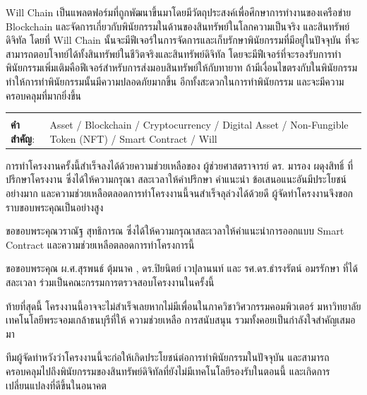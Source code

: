 \documentclass[12pt,oneside,openright,a4paper]{cpe-thai-project}
\begin{document}
Will Chain เป็นแพลตฟอร์มที่ถูกพัฒนาขึ้นมาโดยมีวัตถุประสงค์เพื่อศึกษาการทำงานของเครือข่าย Blockchain  และจัดการเกี่ยวกับพินัยกรรมในด้านของสินทรัพย์ในโลกความเป็นจริง และสินทรัพย์ดิจิทัล โดยที่ Will Chain นั้นจะมีฟีเจอร์ในการจัดการและเก็บรักษาพินัยกรรมที่มีอยู่ในปัจจุบัน ที่จะสามารถตอบโจทย์ได้ทั้งสินทรัพย์ในชีวิตจริงและสินทรัพย์ดิจิทัล โดยจะมีฟีเจอร์ที่จะรองรับการทำพินัยกรรมเพิ่มเติมคือฟีเจอร์สำหรับการส่งมอบสินทรัพย์ให้กับทายาท ถ้ามีเงื่อนไขตรงกับในพินัยกรรม ทำให้การทำพินัยกรรมนั้นมีความปลอดภัยมากขึ้น อีกทั้งสะดวกในการทำพินัยกรรม และจะมีความครอบคลุมที่มากยิ่งขึ้น
\begin{flushleft}
\begin{tabular*}{\textwidth}{@{}lp{}}
 & \\

\textbf{คำสำคัญ}: & Asset / Blockchain / Cryptocurrency / Digital Asset / Non-Fungible Token (NFT) /  Smart Contract / Will 
\end{tabular*}
\end{flushleft}
\endabstract


\preface
\tab การทําโครงงานครั้งนี้สําเร็จลงได้ด้วยความช่วยเหลือของ ผู้ช่วยศาสตราจารย์ ดร. มารอง ผดุงสิทธิ์ ที่ปรึกษาโครงงาน ซึ่งได้ให้ความกรุณา สละเวลาให้คําปรึกษา คําแนะนํา ข้อเสนอแนะอันมีประโยชน์อย่างมาก และความช่วยเหลือตลอดการทําโครงงานนี้จนสําเร็จลุล่วงได้ด้วยดี ผู้จัดทําโครงงานจึงขอกราบขอบพระคุณเป็นอย่างสูง

\tab ขอขอบพระคุณวราณัฐ สุทธิการณ ซึ่งได้ให้ความกรุณาสละเวลาให้คําแนะนําการออกแบบ Smart Contract และความช่วยเหลือตลอดการทำโครงการนี้

\tab ขอขอบพระคุณ ผ.ศ.สุรพนธ์ ตุ้มนาค , ดร.ปิยนิตย์ เวปุลานนท์ และ รศ.ดร.ธํารงรัตน์ อมรรักษา ที่ได้สละเวลา
ร่วมเป็นคณะกรรมการตรวจสอบโครงงานในครั้งนี้ 

\tab ท้ายที่สุดนี้ โครงงานนี้อาจจะไม่สําเร็จเลยหากไม่มีเพื่อนในภาควิชาวิศวกรรมคอมพิวเตอร์ มหาวิทยาลัยเทคโนโลยีพระจอมเกล้าธนบุรีที่ให้ 
ความช่วยเหลือ การสนับสนุน รวมทั้งคอยเป็นกําลังใจสําคัญเสมอมา 

\tab ทีมผู้จัดทำหวังว่าโครงงานนี้จะก่อให้เกิดประโยชน์ต่อการทำพินัยกรรมในปัจจุบัน และสามารถครอบคลุมไปถึงพินัยกรรมของสินทรัพย์ดิจิทัลที่ยังไม่มีเทคโนโลยีรองรับในตอนนี้ และเกิดการเปลี่ยนแปลงที่ดีขึ้นในอนาคต

\tableofcontents                    
\listoftables
\listoffigures                      
\end{document}
